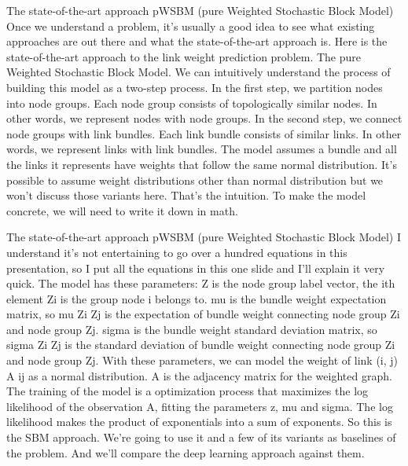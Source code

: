 \documentclass{beamer}
\begin{document}
\begin{frame}{The state-of-the-art approach} {pWSBM (pure Weighted Stochastic Block Model)}
Once we understand a problem, it's usually a good idea to see what existing approaches are out there and what the state-of-the-art approach is. Here is the state-of-the-art approach to the link weight prediction problem. The pure Weighted Stochastic Block Model. We can intuitively understand the process of building this model as a two-step process. In the first step, we partition nodes into node groups. Each node group consists of topologically similar nodes. In other words, we represent nodes with node groups. In the second step, we connect node groups with link bundles. Each link bundle consists of similar links. In other words, we represent links with link bundles. The model assumes a bundle and all the links it represents have weights that follow the same normal distribution. It's possible to assume weight distributions other than normal distribution but we won't discuss those variants here. That's the intuition. To make the model concrete, we will need to write it down in math.
\end{frame}

\begin{frame}{The state-of-the-art approach} {pWSBM (pure Weighted Stochastic Block Model)}
I understand it's not entertaining to go over a hundred equations in this presentation, so I put all the equations in this one slide and I'll explain it very quick. The model has these parameters: Z is the node group label vector, the ith element Zi is the group node i belongs to. mu is the bundle weight expectation matrix, so mu Zi Zj is the expectation of bundle weight connecting node group Zi and node group Zj. sigma is the bundle weight standard deviation matrix, so sigma Zi Zj is the standard deviation of bundle weight connecting node group Zi and node group Zj. With these parameters, we can model the weight of link (i, j) A ij as a normal distribution. A is the adjacency matrix for the weighted graph. The training of the model is a optimization process that maximizes the log likelihood of the observation A, fitting the parameters z, mu and sigma. The log likelihood makes the product of exponentials into a sum of exponents. So this is the SBM approach. We're going to use it and a few of its variants as baselines of the problem. And we'll compare the deep learning approach against them.
\end{frame}
\end{document}
